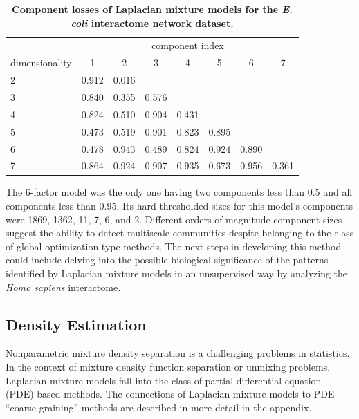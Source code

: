 \documentclass[10pt,letterpaper]{article}
\newlength\savedwidth
\newcommand\thickhline{\noalign{\global\savedwidth\arrayrulewidth\global\arrayrulewidth 2pt}%
\hline
\noalign{\global\arrayrulewidth\savedwidth}}
\begin{document}
\begin{table}[!ht]
\renewcommand{\arraystretch}{1.3}
\begin{adjustwidth}{-2.25in}{0in}
\caption{
{\bf Component losses of Laplacian mixture models for the \emph{E. coli} interactome network dataset.}
}
\centering
\begin{tabular}{l|l|l|l|l|l|l|l}
  \multicolumn{1}{c}{} & \multicolumn{7}{c}{component index}\\
  dimensionality & \multicolumn{1}{|c|}{1} & \multicolumn{1}{c|}{2}  & \multicolumn{1}{c|}{3}  & \multicolumn{1}{c|}{4}  & \multicolumn{1}{c|}{5}  & \multicolumn{1}{c|}{6}  & \multicolumn{1}{c}{7} \\
  \thickhline %
  2 & 0.912 & 0.016   &   &  &  &  &\\ \hline
  3 & 0.840 & 0.355 & 0.576 &  &  &  & \\ \hline
  4 & 0.824 & 0.510 & 0.904& 0.431&  &  &\\ \hline
  5 & 0.473& 0.519& 0.901& 0.823& 0.895&  & \\ \hline
  6 & 0.478& 0.943& 0.489& 0.824& 0.924& 0.890\\ \hline
  7 & 0.864& 0.924 & 0.907& 0.935& 0.673& 0.956& 0.361\\ \hline
\end{tabular}
\label{tab:1}
\end{adjustwidth}
\end{table}
The 6-factor model was the only one having two components less than 0.5 and all components less than 0.95.
Its hard-thresholded sizes for this model's components were 1869, 1362, 11, 7, 6, and 2.
Different orders of magnitude component sizes suggest the ability to detect multiscale communities despite belonging to the class of global optimization type methods.
The next steps in developing this method could include delving into the possible biological significance of the patterns identified by Laplacian mixture models in an unsupervised way by analyzing the \emph{Homo sapiens} interactome.
\subsection*{Density Estimation}\label{sec:density}
Nonparametric mixture density separation is a challenging problems in statistics.
In the context of mixture density function separation or unmixing problems, Laplacian mixture models fall into the class of partial differential equation (PDE)-based methods.
The connections of Laplacian mixture models to PDE ``coarse-graining'' methods are described in more detail in the appendix.
\end{document}
